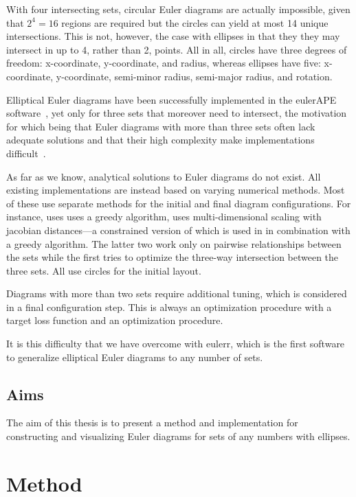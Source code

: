\documentclass[
  a4paper,
  nofonts,
  nobib,
  titlepage,
  justified,
  marginals=raggedouter,
  nohyper
]{tufte-handout}\usepackage[]{graphicx}\usepackage[]{color}
\newcommand{\pkg}[1]{{\fontseries{b}\selectfont #1}}
\begin{document}
With four intersecting sets, circular Euler diagrams are actually impossible,
given that $2^4=16$ regions are required but the circles can yield at most
14 unique intersections. This is not, however, the case with ellipses in that
they they may intersect in up to 4, rather than 2, points. All in all,
circles have three degrees of freedom: x-coordinate, y-coordinate, and
radius, whereas ellipses have five: x-coordinate, y-coordinate, semi-minor
radius, semi-major radius, and rotation.

Elliptical Euler diagrams have been successfully implemented in the
\pkg{eulerAPE} software~\citep{micallef_2014}, yet only for three sets that moreover
need to intersect, the motivation for which being that Euler diagrams
with more than three sets often lack adequate solutions and that their
high complexity make implementations difficult~\citep{micallef_2013}.

As far as we know, analytical solutions to Euler diagrams do not exist. All
existing implementations are instead based on varying numerical methods.
Most of these use separate methods for the initial and final diagram
configurations. For instance, \citet{micallef_2013} uses uses a greedy
algorithm, \citet{wilkinson_2012} uses
multi-dimensional scaling with jacobian distances---a constrained version of
which is used in \citet{frederickson_2016} in combination with a greedy algorithm. The
latter two work only on pairwise relationships between the sets while the first
tries to optimize the three-way intersection between the three sets. All use
circles for the initial layout.

Diagrams with more than two sets require additional tuning, which is considered
in a final configuration step. This is always an optimization procedure with
a target loss function and an optimization procedure.

It is this difficulty that we have overcome with \pkg{eulerr}, which is the
first software to generalize elliptical Euler diagrams to any
number of sets.

\subsection{Aims}

The aim of this thesis is to present a method and implementation for
constructing and visualizing Euler diagrams for sets of any numbers with
ellipses.

\section{Method}
\end{document}
